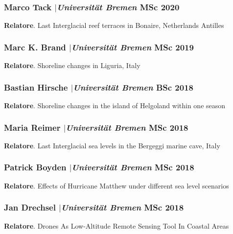 \documentclass[11pt]{article}
\begin{document}
\smallskip

\subsubsection{Marco Tack $|${\normalfont\textit{Universität Bremen}} \hfill MSc 2020}
{\footnotesize 
\textbf{Relatore}. Last Interglacial reef terraces in Bonaire, Netherlands Antilles}

\smallskip

\subsubsection{Marc K. Brand $|${\normalfont\textit{Universität Bremen}} \hfill MSc 2019}
{\footnotesize 
\textbf{Relatore}. Shoreline changes in Liguria, Italy}

\smallskip

\subsubsection{Bastian Hirsche $|${\normalfont\textit{Universität Bremen}} \hfill BSc 2018}
{\footnotesize 
\textbf{Relatore}. Shoreline changes in the island of Helgoland within one season}

\smallskip

\subsubsection{Maria Reimer $|${\normalfont\textit{Universität Bremen}} \hfill MSc 2018}
{\footnotesize 
\textbf{Relatore}.  Last Interglacial sea levels in the Bergeggi marine cave, Italy}

\smallskip

\subsubsection{Patrick Boyden $|${\normalfont\textit{Universität Bremen}} \hfill MSc 2018}
{\footnotesize 
\textbf{Relatore}.  Effects of Hurricane Matthew under different sea level scenarios}

\smallskip

\subsubsection{Jan Drechsel $|${\normalfont\textit{Universität Bremen}} \hfill MSc 2018}
{\footnotesize 
\textbf{Relatore}. Drones As Low-Altitude Remote Sensing Tool In Coastal Areas}
\end{document}
